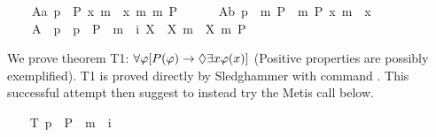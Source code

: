 \begin{isabellebody}
\ \ \ \ A{}a{\isacharcolon}\ {\isachardoublequoteopen}{\isacharbrackleft}{\isasymforall}p\ {\isacharparenleft}{\isasymlambda}{\isasymPhi}{\isachardot}\ P\ {\isacharparenleft}{\isasymlambda}x{\isachardot}\ m{\isasymnot}\ {\isacharparenleft}{\isasymPhi}\ x{\isacharparenright}{\isacharparenright}\ m{\isasymRightarrow}\ m{\isasymnot}\ {\isacharparenleft}P\ {\isasymPhi}{\isacharparenright}{\isacharparenright}{\isacharbrackright}{\isachardoublequoteclose}\ \isanewline
\ \ \ \ A{}b{\isacharcolon}\ {\isachardoublequoteopen}{\isacharbrackleft}{\isasymforall}p\ {\isacharparenleft}{\isasymlambda}{\isasymPhi}{\isachardot}\ m{\isasymnot}\ {\isacharparenleft}P\ {\isasymPhi}{\isacharparenright}\ m{\isasymRightarrow}\ P\ {\isacharparenleft}{\isasymlambda}x{\isachardot}\ m{\isasymnot}\ {\isacharparenleft}{\isasymPhi}\ x{\isacharparenright}{\isacharparenright}{\isacharparenright}{\isacharbrackright}{\isachardoublequoteclose}\ \isanewline
\ \ \ \ A{}{\isacharcolon}\ \ {\isachardoublequoteopen}{\isacharbrackleft}{\isasymforall}p\ {\isacharparenleft}{\isasymlambda}{\isasymPhi}{\isachardot}\ {\isasymforall}p\ {\isacharparenleft}{\isasymlambda}{\isasympsi}{\isachardot}\ {\isacharparenleft}P\ {\isasymPhi}\ m{\isasymand}\ {\isasymbox}\ {\isacharparenleft}{\isasymforall}i\ {\isacharparenleft}{\isasymlambda}X{\isachardot}\ {\isasymPhi}\ X\ m{\isasymRightarrow}\ {\isasympsi}\ X{\isacharparenright}{\isacharparenright}{\isacharparenright}\ m{\isasymRightarrow}\ P\ {\isasympsi}{\isacharparenright}{\isacharparenright}{\isacharbrackright}{\isachardoublequoteclose}%
\begin{isamarkuptext}%
We prove theorem T1: $\forall \varphi [P(\varphi) \rightarrow \Diamond \exists x \varphi(x)]$ 
         (Positive properties are possibly exemplified).  
         T1 is proved directly by Sledghammer with command 
         . This successful 
         attempt then suggest to instead try the Metis call below.%
\end{isamarkuptext}%
\isamarkuptrue%
\ \ \isamarkupfalse%
\ T{}{\isacharcolon}\ {\isachardoublequoteopen}{\isacharbrackleft}{\isasymforall}p\ {\isacharparenleft}{\isasymlambda}{\isasymPhi}{\isachardot}\ P\ {\isasymPhi}\ m{\isasymRightarrow}\ {\isasymdiamond}\ {\isacharparenleft}{\isasymexists}i\ {\isasymPhi}{\isacharparenright}{\isacharparenright}{\isacharbrackright}{\isachardoublequoteclose}\ \ \isanewline

\end{isabellebody}
